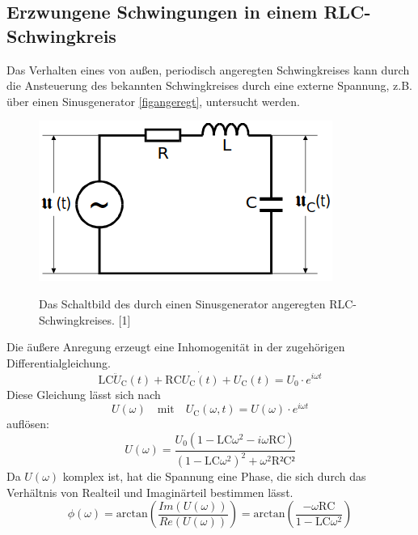 \documentclass[titlepage = firstcover]{scrartcl}
\begin{document}
        \subsection{Erzwungene Schwingungen in einem RLC-Schwingkreis}
            Das Verhalten eines von außen, periodisch angeregten Schwingkreises kann durch die Ansteuerung des bekannten Schwingkreises durch eine externe Spannung, z.B.
            über einen Sinusgenerator \ref{figangeregt}, untersucht werden. 
            \begin{figure}[h]
                \centering
                \caption{Das Schaltbild des durch einen Sinusgenerator angeregten RLC-Schwingkreises. [1]}
                \includegraphics[width = 0.4\linewidth]{angeregt.png}
                \label{fig:angeregt}
            \end{figure}
            \FloatBarrier
            Die äußere Anregung erzeugt eine Inhomogenität in der zugehörigen Differentialgleichung.
            \begin{equation}
                \text{LC}\ddot{U}_{\text{C}}(t) + \text{RC} \dot{U_{\text{C}}(t)} + U_{\text{C}}(t) = U_0 \cdot e^{i\omega t}
                \label{eqn:angeregt}
            \end{equation}
            Diese Gleichung lässt sich nach 
            \begin{equation*}
                U(\omega) \quad \text{mit} \quad U_\text{C}(\omega,t) = U(\omega) \cdot e^{i\omega t}
            \end{equation*}
            auflösen:
            \begin{equation}
                U(\omega) = \frac{U_0 (1-\text{LC}\omega^2-i\omega \text{RC})}{(1-\text{LC}\omega^2)^2 + \omega^2\text{R²C²}}
                \label{eqn:Uangeregt}
            \end{equation}
            Da $U(\omega)$ komplex ist, hat die Spannung eine Phase, die sich durch das Verhältnis von Realteil und Imaginärteil bestimmen lässt.
            \begin{equation}
                \phi (\omega) = \text{arctan}\left(\frac{Im(U(\omega))}{Re(U(\omega))}\right) = \text{arctan}\left(\frac{-\omega \text{RC}}{1-\text{LC}\omega^2}\right)
                \label{eqn:Phase}
            \end{equation}
\end{document}

